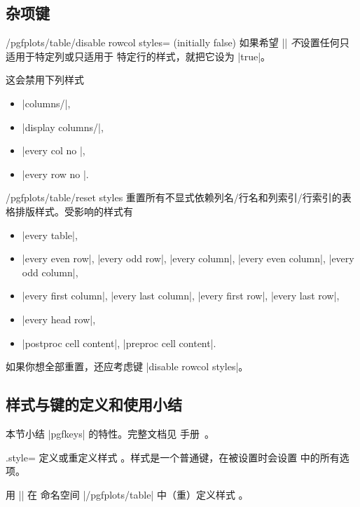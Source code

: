 \documentclass[a4paper,doc2]{ltxdoc}
\begin{document}
\subsection{杂项键}

\begin{key}{/pgfplots/table/disable rowcol styles= (initially false)}
    如果希望 |\pgfplotstabletypeset| \emph{不}设置任何只适用于特定列或只适用于
    特定行的样式，就把它设为 |true|。

    这会禁用下列样式
    \begin{itemize}
        \item |columns/|,
        \item |display columns/|,
        \item |every col no |,
        \item |every row no |.
    \end{itemize}
\end{key}

\begin{key}{/pgfplots/table/reset styles}
    重置所有不显式依赖列名/行名和列索引/行索引的表格排版样式。受影响的样式有
    \begin{itemize}
        \item |every table|,
        \item |every even row|, |every odd row|, |every column|,
            |every even column|, |every odd column|,
        \item |every first column|, |every last column|, |every first row|,
            |every last row|,
        \item |every head row|,
        \item |postproc cell content|, |preproc cell content|.
    \end{itemize}
    如果你想全部重置，还应考虑键 |disable rowcol styles|。
\end{key}


\subsection{样式与键的定义和使用小结}

本节小结 |pgfkeys| 的特性。完整文档见 \pgfname{} 手册~\cite{tikz}。

\begin{handler}{{.style}=}
    定义或重定义样式 。样式是一个普通键，在被设置时会设置
     中的所有选项。

    用 || 在
    命名空间 |/pgfplots/table| 中（重）定义样式 。
\end{handler}
\end{document}

